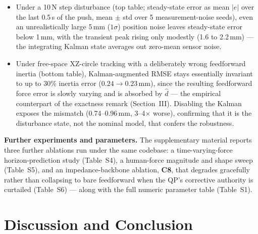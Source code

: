 \documentclass[journal]{IEEEtran}
\newcommand{\dhat}{\hat{d}}
\begin{document}
\begin{itemize}[leftmargin=*,itemsep=1pt,topsep=2pt]
\item Under a 10\,N step disturbance (top table; steady-state error as
mean $|e|$ over the last 0.5\,s of the push, mean $\pm$ std over 5
measurement-noise seeds), even an unrealistically large 5\,mm
($1\sigma$) position noise leaves steady-state error below 1\,mm, with
the transient peak rising only modestly (1.6 to 2.2\,mm) --- the
integrating Kalman state averages out zero-mean sensor noise.
\item Under free-space XZ-circle tracking with a deliberately wrong
feedforward inertia (bottom table), Kalman-augmented RMSE stays
essentially invariant to up to 30\% inertia error ($0.24\to0.23$\,mm),
since the resulting feedforward force error is slowly varying and is
absorbed by $\dhat$ --- the empirical counterpart of the exactness
remark (Section~III). Disabling the Kalman exposes the mismatch
(0.74--0.96\,mm, 3--4$\times$ worse), confirming that it is the
disturbance state, not the nominal model, that confers the robustness.
\end{itemize}

\textbf{Further experiments and parameters.} The supplementary material
reports three further ablations run under the same codebase: a
time-varying-force horizon-prediction study (Table~S4), a human-force
magnitude and shape sweep (Table~S5), and an impedance-backbone
ablation, \textbf{C8}, that degrades gracefully rather than collapsing to
bare feedforward when the QP's corrective authority is curtailed
(Table~S6) --- along with the full numeric parameter table (Table~S1).

\section{Discussion and Conclusion}
\end{document}
